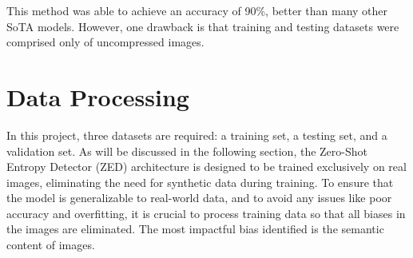 \documentclass{article} %
\begin{document}
This method was able to achieve an accuracy of 90\%, better than many other SoTA models. However, one drawback is that training and testing datasets were comprised only of uncompressed images.

\section{Data Processing}
\label{data}
In this project, three datasets are required: a training set, a testing set, and a validation set. As will be discussed in the following section, the Zero-Shot Entropy Detector (ZED) architecture is designed to be trained exclusively on real images, eliminating the need for synthetic data during training. To ensure that the model is generalizable to real-world data, and to avoid any issues like poor accuracy and overfitting, it is crucial to process training data so that all biases in the images are eliminated. The most impactful bias identified is the semantic content of images.

\end{document}
